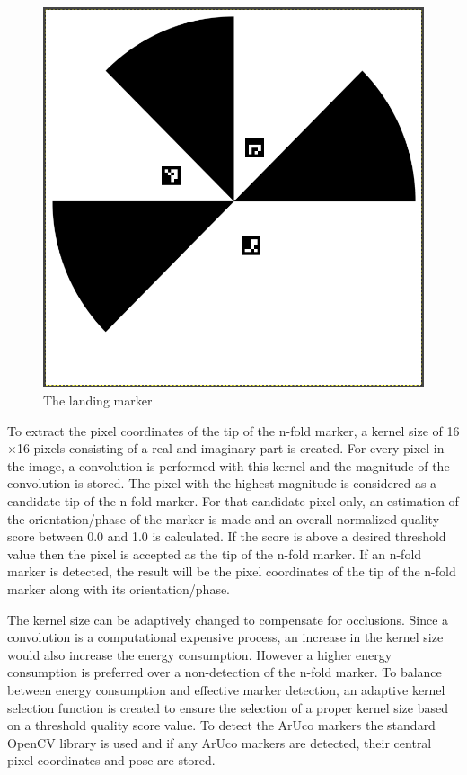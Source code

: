 \documentclass[conference]{IEEEtran}
\begin{document}
\begin{figure}[h]
\centering
\includegraphics[scale=0.15]{n-fold-for-landing.png}
\caption{The landing marker}
\label{fig:LandingMarker}
\end{figure}

To extract the pixel coordinates of the tip of the n-fold marker, a kernel size of 16$\times$16 pixels consisting of a real and imaginary part is created. For every pixel in the image, a convolution is performed with this kernel and the magnitude of the convolution is stored. The pixel with the highest magnitude is considered as a candidate tip of the n-fold marker. For that candidate pixel only, an estimation of the orientation/phase of the marker is made and an overall normalized quality score between 0.0 and 1.0 is calculated. If the score is above a desired threshold value then the pixel is accepted as the tip of the n-fold marker. If an n-fold marker is detected, the result will be the pixel coordinates of the tip of the n-fold marker along with its orientation/phase. 

The kernel size can be adaptively changed to compensate for occlusions. Since a convolution is a computational  expensive process, an increase in the kernel size would also increase the energy consumption. However a higher energy consumption is preferred over a non-detection of the n-fold marker. To balance between energy consumption and effective marker detection, an adaptive kernel selection function is created to ensure the selection of a proper kernel size based on a threshold quality score value.
%
To detect the ArUco markers the standard OpenCV library is used and if any ArUco markers are detected, their central pixel coordinates and pose are stored.
\end{document}
